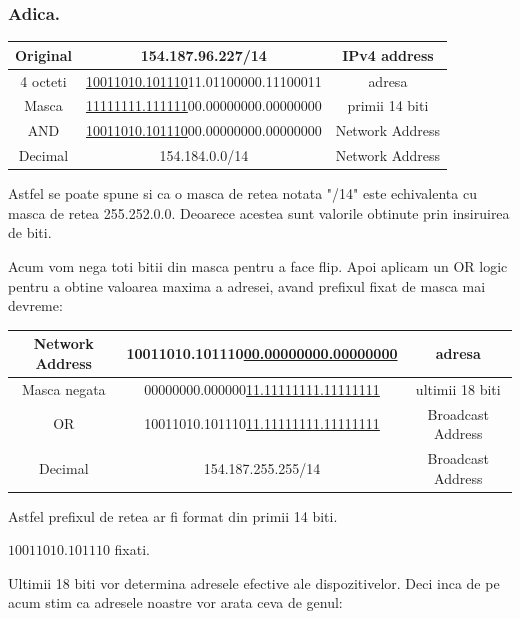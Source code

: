 \documentclass{article}
\begin{document}
\subsubsection{Adica.}
\begin{center}
   \begin{tabular}{|c|c|c|}
   \hline
        Original & 154.187.96.227/14 &  IPv4 address\\
    \hline
      4 octeti &  \underline{10011010.101110}11.01100000.11100011 & adresa  \\
    \hline
      Masca &  \underline{11111111.111111}00.00000000.00000000 & primii 14 biti \\
    \hline \hline
       AND & \underline{10011010.101110}00.00000000.00000000 &  Network Address\\
    \hline
        Decimal & 154.184.0.0/14 &  Network Address\\
    \hline
    \end{tabular}
\end{center}

Astfel se poate spune si ca o masca de retea notata "/14" este echivalenta cu masca de retea 255.252.0.0.
Deoarece acestea sunt valorile obtinute prin insiruirea de biti.

Acum vom nega toti bitii din masca pentru a face flip. Apoi aplicam un OR logic pentru a obtine valoarea maxima a adresei, avand prefixul fixat de masca mai devreme:


\begin{center}
   \begin{tabular}{|c|c|c|}
   \hline

      Network Address &  10011010.101110\underline{00.00000000.00000000} & adresa  \\
    \hline
      Masca negata &  00000000.000000\underline{11.11111111.11111111} & ultimii 18 biti \\
    \hline \hline
       OR & 10011010.101110\underline{11.11111111.11111111} & Broadcast Address\\
    \hline
        Decimal & 154.187.255.255/14 &  Broadcast Address\\
    \hline
    \end{tabular}
\end{center}
Astfel prefixul de retea ar fi format din primii 14 biti.

\begin{center}
    $10011010.101110$ fixati.
\end{center}

Ultimii 18 biti vor determina adresele efective ale dispozitivelor. Deci inca de pe acum stim ca adresele noastre vor arata ceva de genul:
\end{document}
